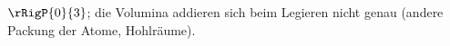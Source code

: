 $\rRigP{0}{3}$; die Volumina addieren sich beim Legieren nicht genau (andere Packung der Atome, Hohlräume).
